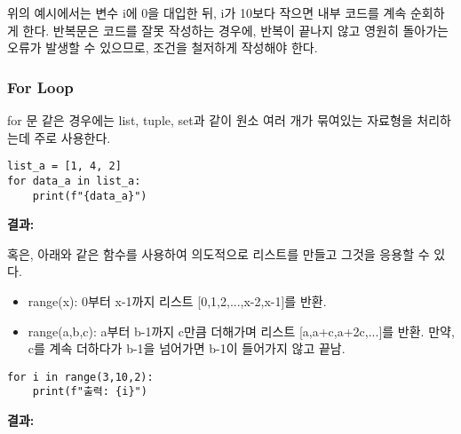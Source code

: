 위의 예시에서는 변수 i에 0을 대입한 뒤, i가 10보다 작으면 내부 코드를 계속 순회하게 한다. 반복문은 코드를 잘못 작성하는 경우에, 반복이 끝나지 않고 영원히 돌아가는 오류가 발생할 수 있으므로, 조건을 철저하게 작성해야 한다.

\subsubsection{For Loop}

for 문 같은 경우에는 list, tuple, set과 같이 원소 여러 개가 묶여있는 자료형을 처리하는데 주로 사용한다.

\begin{minipage}{\textwidth}
\begin{tcolorbox}[colframe=black, colback=white]
\begin{verbatim}
list_a = [1, 4, 2]
for data_a in list_a:
    print(f"{data_a}")
\end{verbatim}
\end{tcolorbox}
\textbf{결과: }
\end{minipage}

혹은, 아래와 같은 함수를 사용하여 의도적으로 리스트를 만들고 그것을 응용할 수 있다.

\begin{itemize}
    \item range(x): 0부터 x-1까지 리스트 [0,1,2,...,x-2,x-1]를 반환. 
    \item range(a,b,c): a부터 b-1까지 c만큼 더해가며 리스트 [a,a+c,a+2c,...]를 반환. 만약, c를 계속 더하다가 b-1을 넘어가면 b-1이 들어가지 않고 끝남.
\end{itemize}

\begin{minipage}{\textwidth}
\begin{tcolorbox}[colframe=black, colback=white]
\begin{verbatim}
for i in range(3,10,2):
    print(f"출력: {i}")
\end{verbatim}
\end{tcolorbox}
\textbf{결과: }
\end{minipage}

